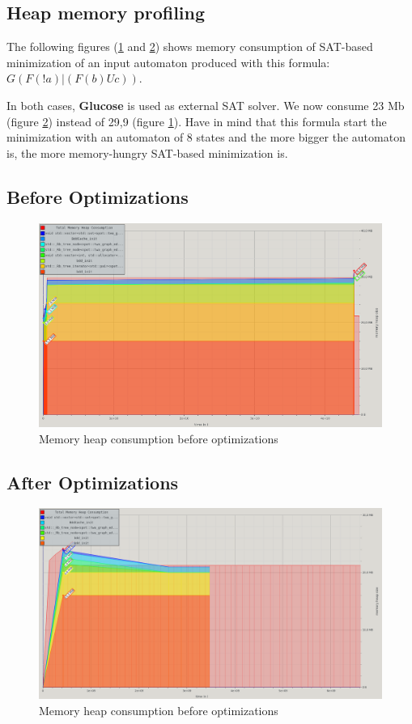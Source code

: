 \begin{landscape}
\section{Heap memory profiling}
\label{memory_profiling}

The following figures (\ref{fig:memory_before} and \ref{fig:memory_now}) shows memory consumption
of SAT-based minimization of an input automaton produced with this formula: $G(F(!a) | (F(b) U c))$.

In both cases, \textbf{Glucose} is used as external SAT solver. We now consume 23 Mb
(figure \ref{fig:memory_now}) instead of 29,9 (figure \ref{fig:memory_before}). Have in mind that
this formula start the minimization with an automaton of 8 states and the more bigger the automaton is, the
more memory-hungry SAT-based minimization is.

\subsection{Before Optimizations}

\begin{figure}[H]
 \centering
 \includegraphics[scale=0.6]{img/memory_before.png}
 \caption{Memory heap consumption before optimizations}
 \label{fig:memory_before}
\end{figure}

\subsection{After Optimizations}
\begin{figure}[H]
 \centering
 \includegraphics[scale=0.6]{img/memory_now.png}
 \caption{Memory heap consumption before optimizations}
 \label{fig:memory_now}
\end{figure}

\end{landscape}